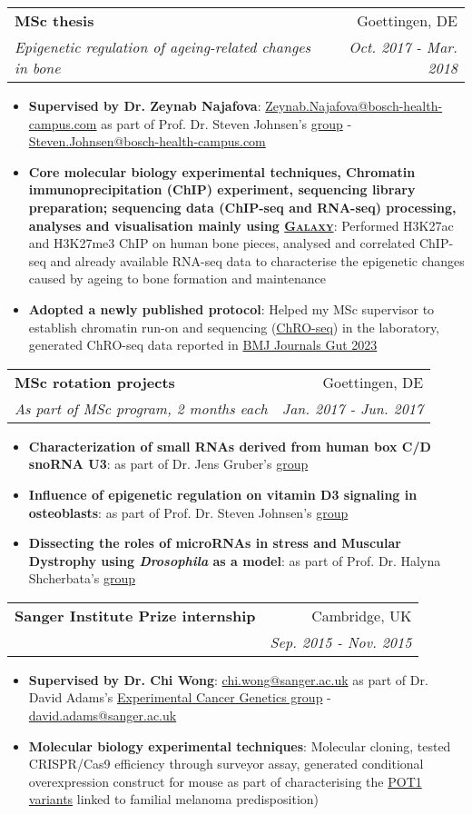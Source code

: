 \documentclass[legalpaper,11pt]{article}
\makeatletter
\newcommand{\resumeItem}[2]{
  \item\small{
    \textbf{#1}{: #2 \vspace{-2pt}}
  }
}
\newcommand{\resumeSubheading}[4]{
  \vspace{-1pt}\item
    \begin{tabular*}{0.97\textwidth}[t]{l@{\extracolsep{\fill}}r}
      \textbf{#1} & #2 \\
      \textit{\small#3} & \textit{\small #4} \\
    \end{tabular*}\vspace{-5pt}
}
\newcommand{\resumeItemListStart}{\begin{itemize}}
\newcommand{\resumeItemListEnd}{\end{itemize}\vspace{-5pt}}
\makeatother
\begin{document}
     \resumeSubheading
      {MSc thesis}{Goettingen, DE}
      {Epigenetic regulation of ageing-related changes in bone}{Oct. 2017 - Mar. 2018}
      \resumeItemListStart
        \resumeItem{Supervised by Dr. Zeynab Najafova}{\href{mailto: Zeynab.Najafova@bosch-health-campus.com}{Zeynab.Najafova@bosch-health-campus.com} as part of Prof. Dr. Steven Johnsen's \href{https://johnsenlab.wordpress.com/}{group} - \href{mailto:Steven.Johnsen@bosch-health-campus.com}{Steven.Johnsen@bosch-health-campus.com}}
        \resumeItem{Core molecular biology experimental techniques, Chromatin immunoprecipitation (ChIP) experiment, sequencing library preparation; sequencing data (ChIP-seq and RNA-seq) processing, analyses and visualisation mainly using \href{https://usegalaxy.org/}{\textsc{Galaxy}}}{Performed H3K27ac and H3K27me3 ChIP on human bone pieces, analysed and correlated ChIP-seq and already available RNA-seq data to characterise the epigenetic changes caused by ageing to bone formation and maintenance}
        \resumeItem{Adopted a newly published protocol}{Helped my MSc supervisor to establish chromatin run-on and sequencing (\href{https://www.nature.com/articles/s41588-018-0244-3#data-availability}{ChRO-seq}) in the laboratory, generated ChRO-seq data reported in \href{http://dx.doi.org/10.1136/gutjnl-2022-328154}{BMJ Journals Gut 2023}}
     \resumeItemListEnd

     \resumeSubheading
      {MSc rotation projects}{Goettingen, DE}
      {As part of MSc program, 2 months each}{Jan. 2017 - Jun. 2017}
      \resumeItemListStart
        \resumeItem{Characterization of small RNAs derived from human box C/D snoRNA U3}{as part of Dr. Jens Gruber's \href{https://bio-protocol.org/UserHome.aspx?id=1032127}{group}}
        \resumeItem{Influence of epigenetic regulation on vitamin D3 signaling in osteoblasts}{as part of Prof. Dr. Steven Johnsen's \href{https://johnsenlab.wordpress.com/}{group}}
        \resumeItem{Dissecting the roles of microRNAs in stress and Muscular Dystrophy using \textit{Drosophila} as a model}{as part of Prof. Dr. Halyna Shcherbata's \href{https://shcherbatalab.wordpress.com/}{group}}
     \resumeItemListEnd

     \resumeSubheading
      {Sanger Institute Prize internship}{Cambridge, UK}
      {}{Sep. 2015 - Nov. 2015}
      \resumeItemListStart
        \resumeItem{Supervised by Dr. Chi Wong}{\href{mailto: chi.wong@sanger.ac.uk}{chi.wong@sanger.ac.uk} as part of Dr. David Adams's \href{https://www.sanger.ac.uk/group/adams-group/}{Experimental Cancer Genetics group} - \href{mailto:david.adams@sanger.ac.uk}{david.adams@sanger.ac.uk}}
        \resumeItem{Molecular biology experimental techniques}
          {Molecular cloning, tested CRISPR/Cas9 efficiency through surveyor assay, generated conditional overexpression construct for mouse as part of characterising the \href{https://www.nature.com/articles/ng.2947}{POT1 variants} linked to familial melanoma predisposition)}
     \resumeItemListEnd
     
\end{document}
